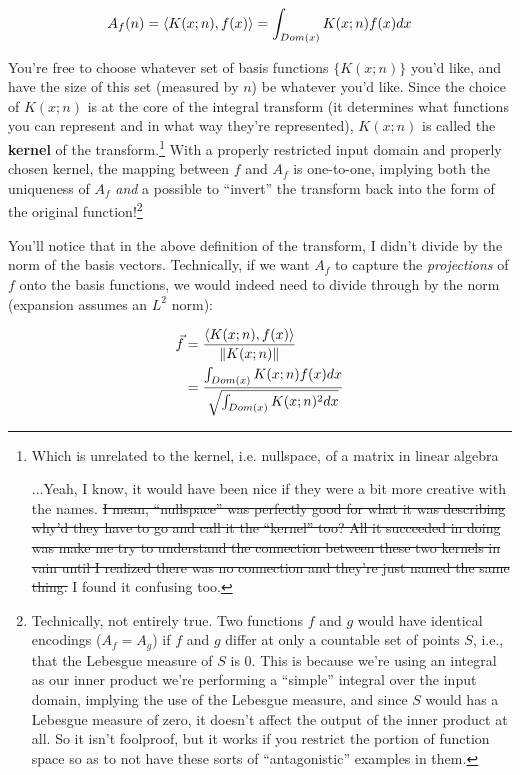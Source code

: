 \documentclass[../main/main.tex]{subfiles}
\begin{document}
\[A_f(n) = \left<K(x;n),f(x)\right> 
  = \int_{Dom(x)} K(x;n) f(x) dx \]

You're free to choose whatever set of basis functions
\(\{K(x;n)\}\) you'd like, and have the size of this set
(measured by \(n\)) be whatever you'd like.
Since the choice of \(K(x;n)\) is at the core of
the integral transform (it determines what functions you
can represent and in what way they're represented),
\(K(x;n)\) is called the 
\textbf{kernel}
of the transform.\footnote{
  Which is unrelated to the kernel, i.e. nullspace, of a matrix in linear algebra\par
  ...Yeah, I know, it would have been nice if they were a
  bit more creative with the names. 
  \sout{I mean, ``nullspace''
  was perfectly good for what it was describing \textemdash{}
  why'd they have to go and call it the ``kernel'' too?
  All it succeeded in doing was make me try to understand
  the connection between these two kernels in vain until
  I realized there was no connection and they're just
  named the same thing.}
  I found it confusing too.
}
With a properly restricted input domain and properly
chosen kernel, the mapping between \(f\) and \(A_f\)
is one-to-one, implying both the uniqueness of \(A_f\)
\emph{and} a possible to ``invert'' the transform
back into the form of the original function!\footnote{
  Technically, not entirely true.
  Two functions \(f\) and \(g\) would have identical encodings
  (\(A_f = A_g\)) if \(f\) and \(g\)
  differ at only a countable set of points \(S\),
  i.e., that the Lebesgue measure of \(S\) is 0.
  This is because we're using an integral as our inner product
  \textemdash{}
  we're performing a ``simple'' integral over the input domain,
  implying the use of the Lebesgue measure,
  and since \(S\) would has a Lebesgue measure of zero,
  it doesn't affect the output of the inner product at all.
  So it isn't foolproof, but it works if you restrict
  the portion of function space so as to not have
  these sorts of ``antagonistic'' examples in them.
}\par

You'll notice that in the above definition of the transform,
I didn't divide by the norm of the basis vectors.
Technically, if we want \(A_f\) to capture the \emph{projections}
of \(f\) onto the basis functions, we would indeed need
to divide through by the norm
(expansion assumes an \(L^2\) norm):

\[\begin{split}
  \vec{f} &= \frac{\left<K(x;n),f(x)\right>}{\norm{K(x;n)}} \\
  &= \frac {\int_{Dom(x)} K(x;n) f(x) dx } {\sqrt{\int_{Dom(x)} K(x;n)^2 dx }}
\end{split}
\]
\end{document}
